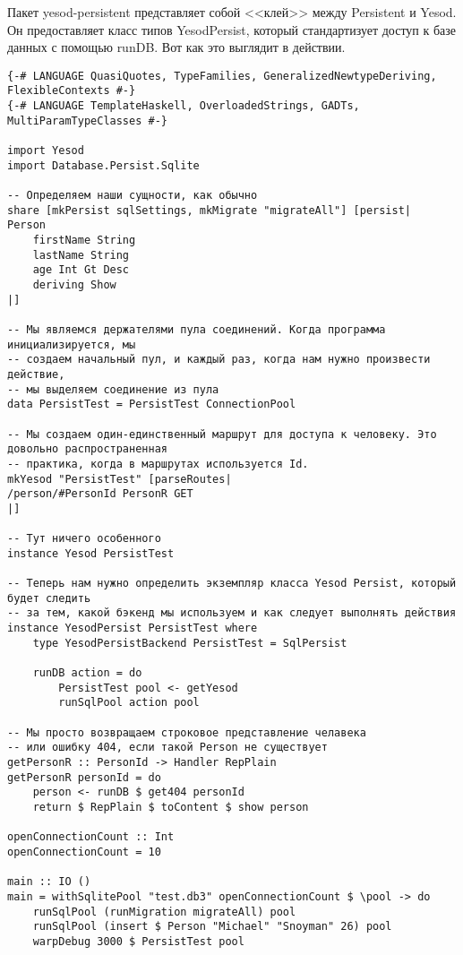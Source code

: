 Пакет yesod-persistent представляет собой <<клей>> между Persistent и Yesod. Он предоставляет класс типов YesodPersist, который стандартизует доступ к базе данных с помощью runDB. Вот как это выглядит в действии.

\begin{lstlisting}
{-# LANGUAGE QuasiQuotes, TypeFamilies, GeneralizedNewtypeDeriving, FlexibleContexts #-}
{-# LANGUAGE TemplateHaskell, OverloadedStrings, GADTs, MultiParamTypeClasses #-}

import Yesod
import Database.Persist.Sqlite

-- Определяем наши сущности, как обычно
share [mkPersist sqlSettings, mkMigrate "migrateAll"] [persist|
Person
    firstName String
    lastName String
    age Int Gt Desc
    deriving Show
|]

-- Мы являемся держателями пула соединений. Когда программа инициализируется, мы
-- создаем начальный пул, и каждый раз, когда нам нужно произвести действие,
-- мы выделяем соединение из пула
data PersistTest = PersistTest ConnectionPool

-- Мы создаем один-единственный маршрут для доступа к человеку. Это довольно распространенная
-- практика, когда в маршрутах используется Id.
mkYesod "PersistTest" [parseRoutes|
/person/#PersonId PersonR GET
|]

-- Тут ничего особенного
instance Yesod PersistTest

-- Теперь нам нужно определить экземпляр класса Yesod Persist, который будет следить
-- за тем, какой бэкенд мы используем и как следует выполнять действия
instance YesodPersist PersistTest where
    type YesodPersistBackend PersistTest = SqlPersist

    runDB action = do
        PersistTest pool <- getYesod
        runSqlPool action pool

-- Мы просто возвращаем строковое представление челавека
-- или ошибку 404, если такой Person не существует
getPersonR :: PersonId -> Handler RepPlain
getPersonR personId = do
    person <- runDB $ get404 personId
    return $ RepPlain $ toContent $ show person

openConnectionCount :: Int
openConnectionCount = 10

main :: IO ()
main = withSqlitePool "test.db3" openConnectionCount $ \pool -> do
    runSqlPool (runMigration migrateAll) pool
    runSqlPool (insert $ Person "Michael" "Snoyman" 26) pool
    warpDebug 3000 $ PersistTest pool
\end{lstlisting}%

